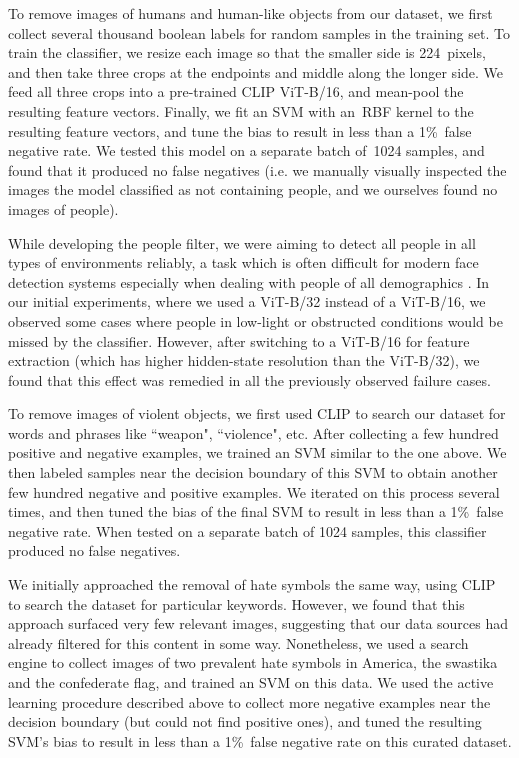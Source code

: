\documentclass{article}
\begin{document}
To remove images of humans and human-like objects from our dataset, we first collect several thousand boolean labels for random samples in the training set. To train the classifier, we resize each image so that the smaller side is 224~pixels, and then take three crops at the endpoints and middle along the longer side. We feed all three crops into a pre-trained CLIP ViT-B/16, and mean-pool the resulting feature vectors. Finally, we fit an SVM with an~RBF kernel to the resulting feature vectors, and tune the bias to result in less than a 1\%~false negative rate. We tested this model on a separate batch of~1024 samples, and found that it produced no false negatives (i.e. we manually visually inspected the images the model classified as not containing people, and we ourselves found no images of people).

While developing the people filter, we were aiming to detect all people in all types of environments reliably, a task which is often difficult for modern face detection systems especially when dealing with people of all demographics \citep{gendershades,robustgeneration}. In our initial experiments, where we used a ViT-B/32 instead of a ViT-B/16, we observed some cases where people in low-light or obstructed conditions would be missed by the classifier. However, after switching to a ViT-B/16 for feature extraction (which has higher hidden-state resolution than the ViT-B/32), we found that this effect was remedied in all the previously observed failure cases.

To remove images of violent objects, we first used CLIP to search our dataset for words and phrases like ``weapon", ``violence", etc. After collecting a few hundred positive and negative examples, we trained an SVM similar to the one above. We then labeled samples near the decision boundary of this SVM to obtain another few hundred negative and positive examples. We iterated on this process several times, and then tuned the bias of the final SVM to result in less than a 1\%~false negative rate. When tested on a separate batch of 1024 samples, this classifier produced no false negatives.

We initially approached the removal of hate symbols the same way, using CLIP to search the dataset for particular keywords. However, we found that this approach surfaced very few relevant images, suggesting that our data sources had already filtered for this content in some way. Nonetheless, we used a search engine to collect images of two prevalent hate symbols in America, the swastika and the confederate flag, and trained an SVM on this data. We used the active learning procedure described above to collect more negative examples near the decision boundary (but could not find positive ones), and tuned the resulting SVM's bias to result in less than a 1\%~false negative rate on this curated dataset.
\end{document}
